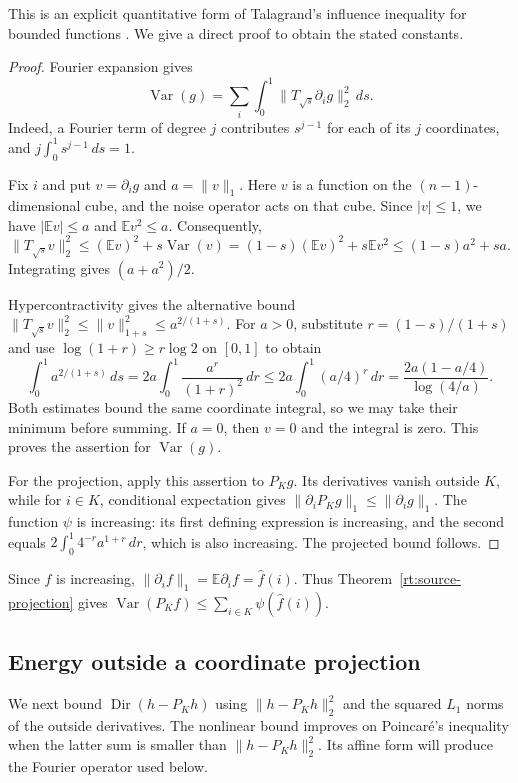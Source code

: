 \documentclass[11pt,letterpaper]{amsart}
\newcommand{\E}{\mathbb E}
\newcommand{\1}{\mathbf 1}
\DeclareMathOperator{\Var}{Var}
\numberwithin{equation}{section}
\begin{document}
This is an explicit quantitative form of Talagrand's influence
inequality for bounded functions
\cite{Talagrand1994,CorderoEskenazis2023}.
We give a direct proof to obtain the stated constants.

\begin{proof}
Fourier expansion gives
\[
 \Var(g)=
 \sum_i\int_0^1\|T_{\sqrt s}\partial_i g\|_2^2\,ds.
\]
Indeed, a Fourier term of degree $j$ contributes $s^{j-1}$
for each of its $j$ coordinates, and
$j\int_0^1s^{j-1}\,ds=1$.

Fix $i$ and put $v=\partial_i g$ and $a=\|v\|_1$.
Here $v$ is a function on the $(n-1)$-dimensional cube,
and the noise operator acts on that cube.
Since $|v|\le1$, we have $|\E v|\le a$ and $\E v^2\le a$.
Consequently,
\[
 \|T_{\sqrt s}v\|_2^2
 \le(\E v)^2+s\Var(v)
 =(1-s)(\E v)^2+s\E v^2
 \le(1-s)a^2+sa.
\]
Integrating gives $(a+a^2)/2$.

Hypercontractivity gives the alternative bound
$\|T_{\sqrt s}v\|_2^2\le\|v\|_{1+s}^2
\le a^{2/(1+s)}$.
For $a>0$, substitute $r=(1-s)/(1+s)$ and use
$\log(1+r)\ge r\log2$ on $[0,1]$ to obtain
\[
 \int_0^1a^{2/(1+s)}\,ds
 =2a\int_0^1\frac{a^r}{(1+r)^2}\,dr\le2a\int_0^1(a/4)^r\,dr
 =\frac{2a(1-a/4)}{\log(4/a)}.
\]
Both estimates bound the same coordinate integral, so we may
take their minimum before summing.
If $a=0$, then $v=0$ and the integral is zero.
This proves the assertion for $\Var(g)$.

For the projection, apply this assertion to $P_Kg$.
Its derivatives vanish outside $K$, while for $i\in K$,
conditional expectation gives
$\|\partial_iP_Kg\|_1\le\|\partial_i g\|_1$.
The function $\psi$ is increasing: its first defining expression
is increasing, and the second equals
$2\int_0^1 4^{-r}a^{1+r}\,dr$, which is also increasing.
The projected bound follows.
\end{proof}

Since $f$ is increasing,
$\|\partial_i f\|_1=\E\partial_i f=\widehat f(i)$.
Thus Theorem~\ref{rt:source-projection} gives
$\Var(P_Kf)\le\sum_{i\in K}\psi(\widehat f(i))$.

\subsection{Energy outside a coordinate projection}

We next bound $\operatorname{Dir}(h-P_Kh)$ using
$\|h-P_Kh\|_2^2$ and the squared $L_1$ norms of the outside
derivatives.
The nonlinear bound improves on Poincar\'e's inequality when
the latter sum is smaller than $\|h-P_Kh\|_2^2$.
Its affine form will produce the Fourier operator used below.
\end{document}
